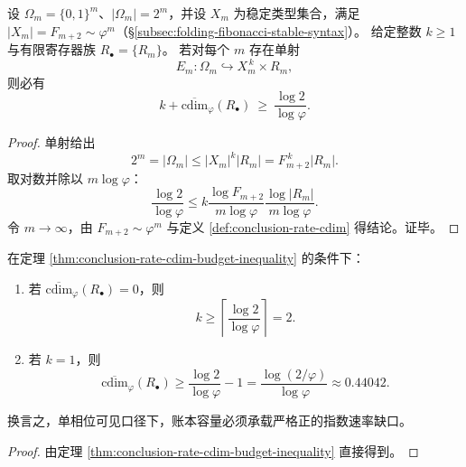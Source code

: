\begin{theorem}[可见相位与账本速率的预算守恒不等式]\label{thm:conclusion-rate-cdim-budget-inequality}
设 \(\Omega_m=\{0,1\}^m\)、\(|\Omega_m|=2^m\)，并设 \(X_m\) 为稳定类型集合，满足 \(|X_m|=F_{m+2}\sim\varphi^m\)（\S\ref{subsec:folding-fibonacci-stable-syntax}）。
给定整数 \(k\ge 1\) 与有限寄存器族 \(R_\bullet=\{R_m\}\)。
若对每个 \(m\) 存在单射
\[
E_m:\Omega_m\hookrightarrow X_m^{\,k}\times R_m,
\]
则必有
\[
k+\overline{\mathrm{cdim}}_{\varphi}(R_\bullet)\ \ge\ \frac{\log 2}{\log\varphi}.
\]
\end{theorem}
\begin{proof}
单射给出
\[
2^m=|\Omega_m|
\le |X_m|^k|R_m|
=F_{m+2}^{\,k}|R_m|.
\]
取对数并除以 \(m\log\varphi\)：
\[
\frac{\log 2}{\log\varphi}
\le
k\frac{\log F_{m+2}}{m\log\varphi}
\frac{\log|R_m|}{m\log\varphi}.
\]
令 \(m\to\infty\)，由 \(F_{m+2}\sim\varphi^m\) 与定义 \ref{def:conclusion-rate-cdim} 得结论。证毕。
\end{proof}

\begin{corollary}[二圆阈值与一圆缺口]\label{cor:conclusion-rate-cdim-two-circle-threshold}
在定理 \ref{thm:conclusion-rate-cdim-budget-inequality} 的条件下：
\begin{enumerate}
  \item 若 \(\overline{\mathrm{cdim}}_{\varphi}(R_\bullet)=0\)，则
  \[
  k\ge \left\lceil\frac{\log 2}{\log\varphi}\right\rceil=2.
  \]
  \item 若 \(k=1\)，则
  \[
  \overline{\mathrm{cdim}}_{\varphi}(R_\bullet)
  \ge
  \frac{\log 2}{\log\varphi}-1
  =
  \frac{\log(2/\varphi)}{\log\varphi}\approx 0.44042.
  \]
\end{enumerate}
换言之，单相位可见口径下，账本容量必须承载严格正的指数速率缺口。
\end{corollary}
\begin{proof}
由定理 \ref{thm:conclusion-rate-cdim-budget-inequality} 直接得到。
\end{proof}

